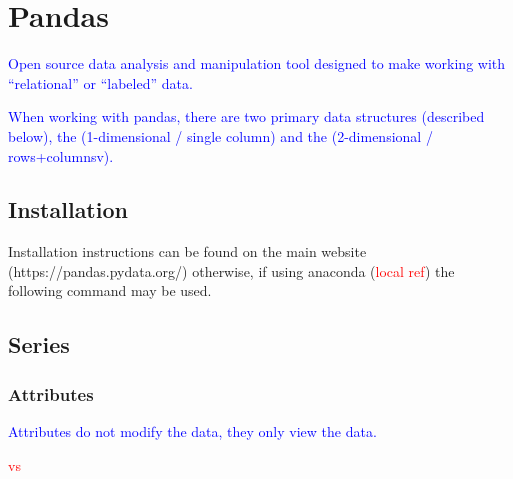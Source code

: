 \section{Pandas}

\textcolor{blue}{Open source data analysis and manipulation tool designed to make working with ``relational'' or ``labeled'' data.}

\textcolor{blue}{When working with pandas, there are two primary data structures (described below), the  (1-dimensional / single column) and the  (2-dimensional / rows+columnsv).}

\subsection{Installation}

Installation instructions can be found on the main website (https://pandas.pydata.org/) otherwise, if using anaconda (\textcolor{red}{local ref}) the following command may be used.


\subsection{Series}




\subsubsection{Attributes}

\textcolor{blue}{Attributes do not modify the data, they only view the data.}


\textcolor{blue}{}
\textcolor{blue}{}
\textcolor{blue}{}
\textcolor{blue}{}
\textcolor{blue}{}
\textcolor{blue}{}

\textcolor{red}{ vs }

\textcolor{blue}{}
\textcolor{blue}{}
\textcolor{blue}{}
\textcolor{blue}{}
\textcolor{blue}{}
\textcolor{blue}{}
\textcolor{blue}{}

